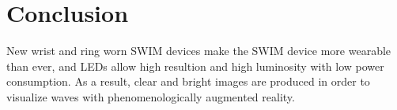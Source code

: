 \documentclass[conference]{sig-alternate-05-2015}
\begin{document}

\section{Conclusion}
New wrist and ring worn SWIM devices make the SWIM device more wearable than ever, and LEDs allow high resultion and high luminosity with low power consumption. As a result, clear and bright images are produced in order to visualize waves with phenomenologically augmented reality.


%

%



\end{document}
